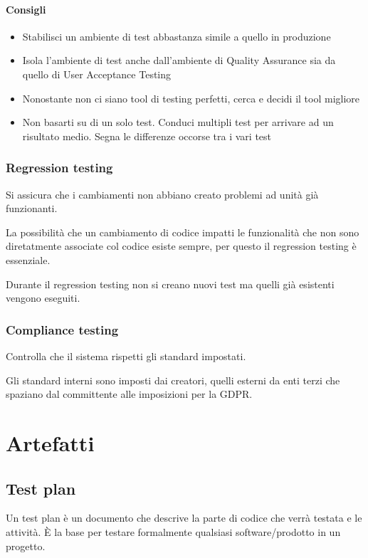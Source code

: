 \documentclass[11pt,a4paper]{book}
\begin{document}
\subsubsection{Consigli}
\begin{itemize}
	\item Stabilisci un ambiente di test abbastanza simile a quello in produzione
	\item Isola l'ambiente di test anche dall'ambiente di Quality Assurance sia da quello di User Acceptance Testing
	\item Nonostante non ci siano tool di testing perfetti, cerca e decidi il tool migliore
	\item Non basarti su di un solo test. Conduci multipli test per arrivare ad un risultato medio. Segna le differenze occorse tra i vari test
\end{itemize}


\subsection{Regression testing}
Si assicura che i cambiamenti non abbiano creato problemi ad unità già funzionanti.

La possibilità che un cambiamento di codice impatti le funzionalità che non sono diretatmente associate col codice esiste sempre, per questo il regression testing è essenziale.

Durante il regression testing non si creano nuovi test ma quelli già esistenti vengono eseguiti.

\subsection{Compliance testing}
Controlla che il sistema rispetti gli standard impostati.

Gli standard interni sono imposti dai creatori, quelli esterni da enti terzi che spaziano dal committente alle imposizioni per la GDPR.

\chapter{Artefatti}
\section{Test plan}
Un test plan è un documento che descrive la parte di codice che verrà testata e le attività. È la base per testare formalmente qualsiasi software/prodotto in un progetto.
\end{document}
